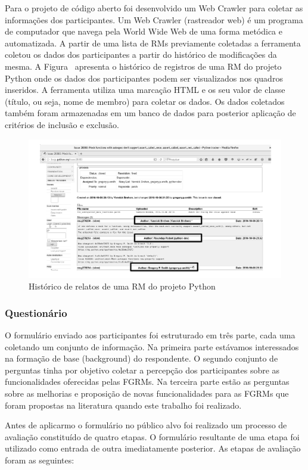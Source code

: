 Para o projeto de código aberto foi desenvolvido um Web Crawler para coletar as
informações dos participantes. Um Web Crawler (rastreador web) é um programa de
computador que navega pela World Wide Web de uma forma metódica e automatizada.
A partir de uma lista de RMs previamente coletadas a ferramenta coletou os dados
dos participantes a partir do histórico de modificações da mesma. A
Figura~\cite{fig:historico-rm-python} apresenta o histórico de registros de uma
RM do projeto Python onde os dados dos participantes podem ser visualizados nos
quadros inseridos. A ferramenta utiliza uma marcação HTML e os seu valor de
classe (título, ou seja, nome de membro) para coletar os dados. Os dados
coletados também foram armazenadas em um banco de dados para posterior aplicação
de critérios de inclusão e exclusão.

\begin{figure}[htpb]
	\centering
	\includegraphics[width=0.6\linewidth]{./chapter-pesquisa-com-profissionais/img/historico-rm-python.pdf}
	\caption{Histórico de relatos de uma RM do projeto Python}
\label{fig:historico-rm-python}
\end{figure}

\subsubsection{Questionário}
\label{subsubsec:questionario}

O formulário enviado aos participantes foi estruturado em três parte, cada uma
coletando um conjunto de informação. Na primeira parte estávamos interessados na
formação de base (background) do respondente. O segundo conjunto de perguntas
tinha por objetivo  coletar a percepção dos participantes sobre as
funcionalidades oferecidas pelas FGRMs\@. Na terceira parte estão as perguntas
sobre as melhorias e proposição de novas funcionalidades para as FGRMs que foram
propostas na literatura quando este trabalho foi realizado.

Antes de aplicarmo o formulário no público alvo foi realizado um processo de
avaliação constituído de quatro etapas. O formulário resultante de uma etapa foi
utilizado como entrada de outra imediatamente posterior. As etapas de avaliação
foram as seguintes:

